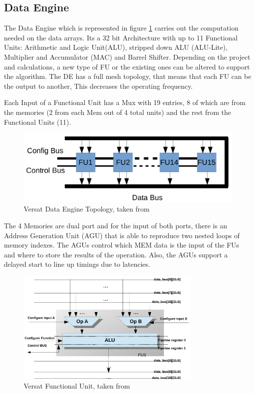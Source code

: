 \subsection{Data Engine}
\quad The Data Engine which is represented in figure \ref{figure:DE} carries out the computation needed on the data arrays. Its a 32 bit Architecture with up to 11 Functional Units:
 Arithmetic and Logic Unit(ALU), stripped down ALU (ALU-Lite),
 Multiplier and Accumulator (MAC) and Barrel Shifter.
 Depending on the project and calculations, a new type of FU or the existing ones can be altered to support the algorithm.
 The DE has a full mesh  topology, that means that each FU can be the output to another, This decreases the operating frequency.

 Each Input of a Functional Unit has a Mux with 19 entries, 8 of which are from the memories (2 from each Mem out of 4 total units) and the rest from the Functional Units (11).

 \begin{figure}[!htbp]
    \centering
    \includegraphics[width=1\textwidth]{Figures/de.png}
    \caption{Versat Data Engine Topology, taken from~\cite{sousa:FFT}}
    \label{figure:DE}
\end{figure} 

 The 4 Memories are dual port and for the input of both ports, 
 there is an Address Generation Unit (AGU) that is able to 
 reproduce two nested loops of memory indexes.
 The AGUs control which MEM data is the input of the FUs and where
 to store the results of the operation. Also, the AGUs support a delayed start to line up timings
due to latencies.

\begin{figure}[!htbp]
    \centering
    \includegraphics[width=0.8\textwidth]{Figures/fu.pdf}
    \caption{Versat Functional Unit, taken from~\cite{lopes:versat}}
    \label{figure:FU}
\end{figure} 


